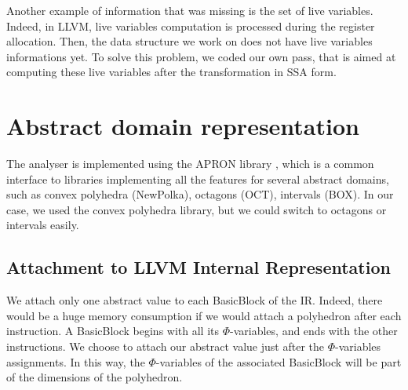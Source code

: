 \documentclass[a4paper,english,titlepage,11pt]{report}
\begin{document}
Another example of information that was missing is the set of live variables.
Indeed, in LLVM, live variables computation is processed during the register
allocation. Then, the data structure we work on does not have live variables
informations yet. To solve this problem, we coded our own pass, that is aimed at
computing these live variables after the transformation in SSA form.

 \section{Abstract domain representation}

	The analyser is implemented using the APRON library \cite{JM09}, which
	is a common interface to libraries implementing all the features
	for several abstract domains, such as convex polyhedra (NewPolka), 
	octagons (OCT), intervals (BOX).
	In our case, we used the convex polyhedra library, but we could switch
	to octagons or intervals easily.

	\subsection{Attachment to LLVM Internal Representation}

	We attach only one abstract value to each BasicBlock of the IR. Indeed,
	there would be a huge memory consumption if we would attach a polyhedron
	after each instruction. A BasicBlock begins with all its $\Phi$-variables,
	and ends with the other instructions. We choose to attach our abstract value
	just after the $\Phi$-variables assignments. In this way, the
	$\Phi$-variables of the associated BasicBlock will be part of the dimensions
	of the polyhedron.
\end{document}
